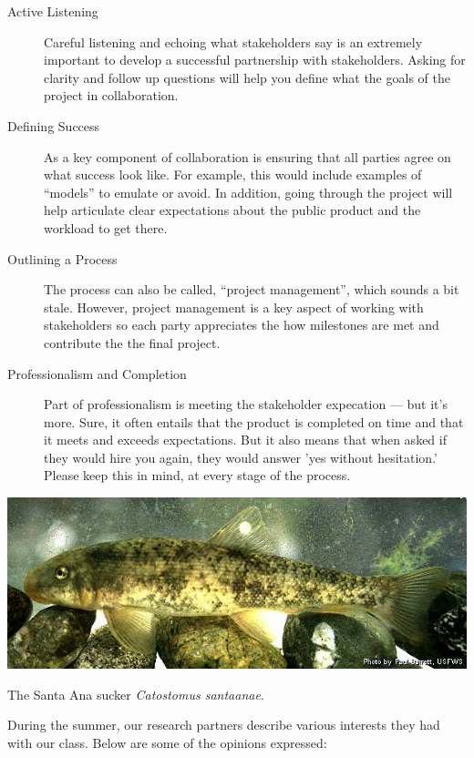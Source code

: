 \documentclass{tufte-handout}\usepackage[]{graphicx}\usepackage[]{color}
\begin{document}
\begin{description}
  \item[Active Listening] Careful listening and echoing what stakeholders say is an extremely important to develop a successful partnership with stakeholders. Asking for clarity and follow up questions will help you define what the goals of the project in collaboration.
  \item[Defining Success] As a key component of collaboration is ensuring that all parties agree on what success look like. For example, this would include examples of ``models'' to emulate or avoid. In addition, going through the project will help articulate clear expectations about the public product and the workload to get there.
  \item[Outlining a Process] The process can also be called, ``project management'', which sounds a bit stale. However, project management is a key aspect of working with stakeholders so each party appreciates the how milestones are met and contribute the the final project. 
  \item[Professionalism and Completion] Part of professionalism is meeting the stakeholder expecation --- but it's more. Sure, it often entails that the product is completed on time and that it meets and exceeds expectations. But it also means that when asked if they would hire you again, they would answer 'yes without hesitation.'  Please keep this in mind, at every stage of the process.  
\end{description}

\begin{marginfigure}
   \includegraphics[width=1.0\textwidth]{Catostomus_santaanae.jpg}
  \caption{The Santa Ana sucker \emph{Catostomus santaanae}.}
\end{marginfigure}

During the summer, our research partners describe various interests they had with our class. Below are some of the opinions expressed:
\end{document}
